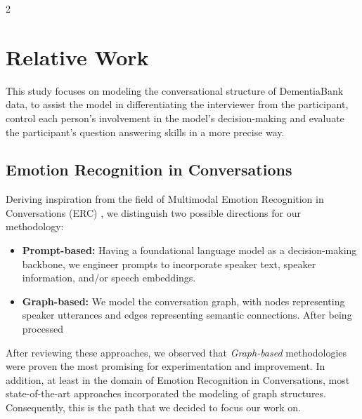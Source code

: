 \documentclass[10pt]{article}
\begin{document}
\begin{multicols}{2}
\section{Relative Work}
\par This study focuses on modeling the conversational structure of
DementiaBank data, to assist the model in differentiating the interviewer from
the participant, control each person's involvement in the model's
decision-making and evaluate the participant's question answering skills in a
more precise way.
\subsection{Emotion Recognition in Conversations}
\par Deriving inspiration from the field of Multimodal Emotion Recognition in
Conversations (ERC) \cite{wuMultimodalEmotionRecognition2025,
linParalinguisticsEnhancedLargeLanguage2024, chenGOATSLMSpokenLanguage2025}, we
distinguish two possible directions for our methodology:
\begin{itemize}
	\item \textbf{Prompt-based:} Having a foundational language model as a
		decision-making backbone, we engineer prompts to incorporate speaker
		text, speaker information, and/or speech embeddings.
	\item \textbf{Graph-based:} We model the conversation graph, with nodes
		representing speaker utterances and edges representing semantic
		connections. After being processed 
\end{itemize}
\par After reviewing these approaches, we observed that \emph{Graph-based}
methodologies were proven the most promising for experimentation and
improvement. In addition, at least in the domain of Emotion Recognition in
Conversations, most state-of-the-art approaches incorporated the modeling of
graph structures. Consequently, this is the path that we decided to focus our
work on.


\end{multicols}
\end{document}
